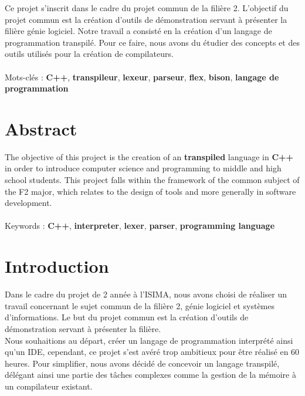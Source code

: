 \documentclass[a4paper]{article}%
\begin{document}
Ce projet s'inscrit dans le cadre du projet commun de la filière 2. L'objectif
du projet commun est la création d'outils de démonstration servant à présenter
la filière génie logiciel. Notre travail a consisté en la création d'un langage
de programmation transpilé. Pour ce faire, nous avons du étudier des concepts et
des outils utilisés pour la création de compilateurs. %
\\~\\

\noindent
Mots-clés : \textbf{C++}, \textbf{transpileur}, \textbf{lexeur},
\textbf{parseur}, \textbf{flex}, \textbf{bison},  \textbf{langage de
programmation}
\\[2\baselineskip]

\section{Abstract}

The objective of this project is the creation of an \textbf{transpiled}
language  in \textbf{C++} in order to introduce computer science and programming
to middle and high school students. This project falls within the framework of
the common subject of the F2 major, which relates to the design of tools and
more generally in software development.
\\~\\

\noindent
Keywords : \textbf{C++}, \textbf{interpreter}, \textbf{lexer}, \textbf{parser},
\textbf{programming language}

\clearpage{}%

\section{Introduction}
\large
Dans le cadre du projet de 2 année à l'ISIMA, nous avons choisi de
réaliser un travail concernant le sujet commun de la filière 2, génie logiciel
et systèmes d'informations. Le but du projet commun est la création d'outils de
démonstration servant à présenter la filière.\\

Nous souhaitions au départ, créer un langage de programmation interprété ainsi
qu'un IDE, cependant, ce projet s'est avéré trop ambitieux pour être réalisé en
60 heures. Pour simplifier, nous avons décidé de concevoir un langage transpilé,
délégant ainsi une partie des tâches complexes comme la gestion de la mémoire à
un compilateur existant.\\
\end{document}
